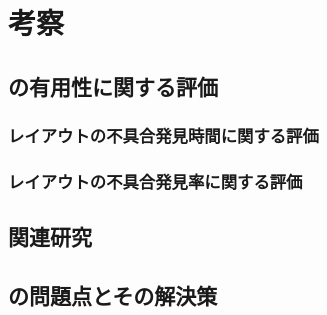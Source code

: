 \chapter{考察}\label{cha:Discussion}



\section{\toolName の有用性に関する評価}\label{sec:evalue_usefulness}

\subsection{レイアウトの不具合発見時間に関する評価}\label{subsec:evalue_required_time}

\subsection{レイアウトの不具合発見率に関する評価}\label{subsec:evalue_accuracy}



\section{関連研究}\label{sec:relation_research}



\section{\toolName の問題点とその解決策}\label{sec:AWSEL_problems}